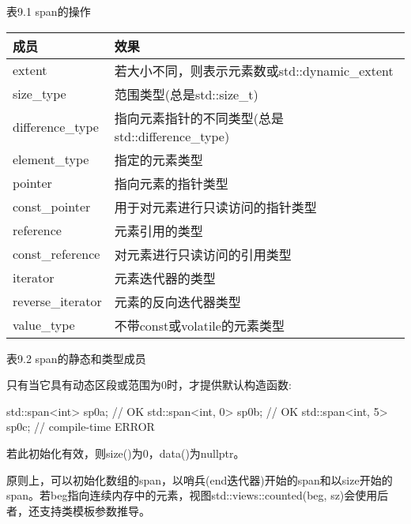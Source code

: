 \begin{center}
表9.1 span的操作
\end{center}

\begin{longtable}[c]{|l|l|}
\hline
\textbf{成员} & \textbf{效果}                      \\ \hline
\endfirsthead
%
\endhead
%
extent            & 若大小不同，则表示元素数或std::dynamic\_extent              \\ \hline
size\_type      & 范围类型(总是std::size\_t) \\ \hline
difference\_type  & 指向元素指针的不同类型(总是std::difference\_type) \\ \hline
element\_type   & 指定的元素类型       \\ \hline
pointer         & 指向元素的指针类型    \\ \hline
const\_pointer    & 用于对元素进行只读访问的指针类型                 \\ \hline
reference       & 元素引用的类型  \\ \hline
const\_reference  & 对元素进行只读访问的引用类型               \\ \hline
iterator        & 元素迭代器的类型  \\ \hline
reverse\_iterator & 元素的反向迭代器类型                             \\ \hline
value\_type       & 不带const或volatile的元素类型                            \\ \hline
\end{longtable}

\begin{center}
表9.2 span的静态和类型成员
\end{center}


只有当它具有动态区段或范围为0时，才提供默认构造函数:

\begin{cpp}
std::span<int> sp0a; // OK
std::span<int, 0> sp0b; // OK
std::span<int, 5> sp0c; // compile-time ERROR
\end{cpp}

若此初始化有效，则size()为0，data()为nullptr。

原则上，可以初始化数组的span，以哨兵(end迭代器)开始的span和以size开始的span。若beg指向连续内存中的元素，视图std::views::counted(beg, sz)会使用后者，还支持类模板参数推导。

